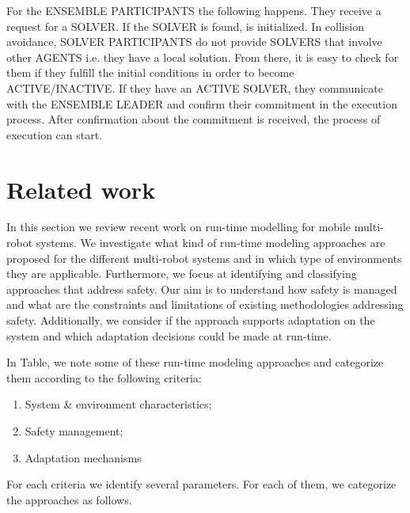 \documentclass[journal]{IEEEtran}
\theoremstyle{definition}
\newcommand\darko[1]{\nb{Darko}{#1}}
\newcommand\patrizio[1]{\nb{Patrizio}{#1}}
\newcommand\ivano[1]{\nb{Ivano}{#1}}
\begin{document}
For the ENSEMBLE PARTICIPANTS the following happens. They receive a request for a SOLVER. If the SOLVER is found, is initialized. In collision avoidance, SOLVER PARTICIPANTS do not provide SOLVERS that involve other AGENTS i.e. they have a local solution. From there, it is easy to check for them if they fulfill the initial conditions in order to become ACTIVE/INACTIVE. If they have an ACTIVE SOLVER, they communicate with the ENSEMBLE LEADER and confirm their commitment in the execution process. After confirmation about the commitment is received, the process of execution can start. 


\section{Related work}

In this section we review recent work on 
run-time modelling for mobile multi-robot systems. We investigate what kind of run-time modeling approaches are proposed for the different multi-robot systems and in which type of environments they are applicable. Furthermore, we focus at  identifying and  classifying approaches that address safety. Our aim is to understand how safety is managed and what are the constraints and limitations of existing methodologies  addressing safety.
Additionally, we consider if the approach supports adaptation on the system and which adaptation decisions  could be made at run-time.

In Table, we note some of these run-time modeling approaches and categorize them according to the following criteria:
\begin{enumerate}
\item System \& environment characteristics;
\item Safety management;
\item Adaptation mechanisms
\end{enumerate}




For each criteria we identify several parameters.%
For each of them, we categorize the approaches as follows.
\end{document}
